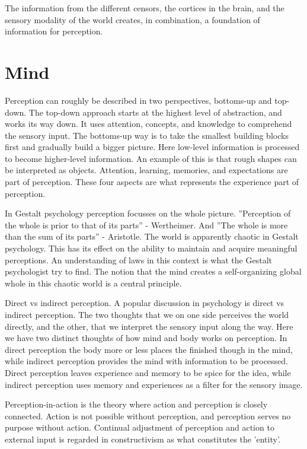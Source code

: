 \documentclass[12pt, a4paper]{article}
\begin{document}
The information from the different censors, the cortices in the brain, and the
sensory modality of the world creates, in combination, a foundation of
information for perception.

\section{Mind}
Perception can roughly be described in two perspectives, bottoms-up and top-down. 
The top-down approach starts at the highest level of abstraction, and works its
way down. It uses attention, concepts, and knowledge to comprehend the sensory
input. The bottoms-up way is to take the smallest building blocks first and gradually
build a bigger picture. Here low-level information is processed to become
higher-level information. An example of this is that rough shapes can be
interpreted as objects. \cite{Wiki-perception}
Attention, learning, memories, and expectations are part of perception. These
four aspects are what represents the experience part of perception. 

In Gestalt psychology perception focusses on the whole picture. 
”Perception of the whole is prior to that of its parts” - Wertheimer. And 
”The whole is more than the sum of its parts” - Aristotle. 
The world is apparently chaotic in Gestalt psychology. This has its effect on
the ability to maintain and acquire meaningful perceptions. An understanding of
laws in this context is what the Gestalt psychologist try to find. The notion
that the mind creates a self-organizing global whole in this chaotic world is a
central principle. \cite{Wiki-gestalt} 

Direct vs indirect perception. 
A popular discussion in psychology is direct vs indirect perception. The two
thoughts that we on one side perceives the world directly, and the other, that
we interpret the sensory input along the way. Here we have two distinct
thoughts of how mind and body works on perception. In direct perception the
body more or less places the finished though in the mind, while indirect
perception provides the mind with information to be processed. Direct
perception leaves experience and memory to be spice for the idea, while
indirect perception uses memory and experiences as a filter for the sensory
image. \cite{Wiki-naiveRealism} 

Perception-in-action is the theory where action and perception is closely
connected. Action is not possible without perception, and perception serves no
purpose without action. Continual adjustment of perception and action to
external input is regarded in constructivism as what constitutes the 'entity'. 
\end{document}
